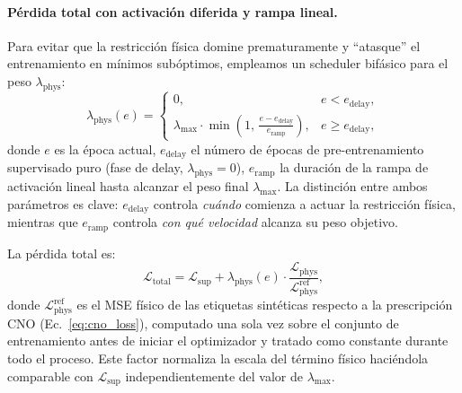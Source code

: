 \documentclass[sigconf,ACM]{acmart}
\begin{document}
\paragraph{Pérdida total con activación diferida y rampa lineal.}
Para evitar que la restricción física domine prematuramente y ``atasque'' el entrenamiento en mínimos subóptimos, empleamos un scheduler bifásico para el peso $\lambda_{\mathrm{phys}}$:
\begin{equation}
  \lambda_{\mathrm{phys}}(e) =
  \begin{cases}
    0, & e < e_{\mathrm{delay}}, \\
    \lambda_{\max} \cdot \min\!\left(1,\, \frac{e - e_{\mathrm{delay}}}{e_{\mathrm{ramp}}}\right), & e \geq e_{\mathrm{delay}},
  \end{cases}
  \label{eq:lambda_schedule}
\end{equation}
donde $e$ es la época actual, $e_{\mathrm{delay}}$ el número de épocas de pre-entrenamiento supervisado puro (fase de delay, $\lambda_{\mathrm{phys}}=0$), $e_{\mathrm{ramp}}$ la duración de la rampa de activación lineal hasta alcanzar el peso final $\lambda_{\max}$. La distinción entre ambos parámetros es clave: $e_{\mathrm{delay}}$ controla \emph{cuándo} comienza a actuar la restricción física, mientras que $e_{\mathrm{ramp}}$ controla \emph{con qué velocidad} alcanza su peso objetivo.

La pérdida total es:
\begin{equation}
  \mathcal{L}_{\mathrm{total}} = \mathcal{L}_{\mathrm{sup}} + \lambda_{\mathrm{phys}}(e) \cdot \frac{\mathcal{L}_{\mathrm{phys}}}{\mathcal{L}_{\mathrm{phys}}^{\mathrm{ref}}},
  \label{eq:l_total}
\end{equation}
donde $\mathcal{L}_{\mathrm{phys}}^{\mathrm{ref}}$ es el MSE físico de las etiquetas sintéticas respecto a la prescripción CNO (Ec.~\ref{eq:cno_loss}), computado una sola vez sobre el conjunto de entrenamiento antes de iniciar el optimizador y tratado como constante durante todo el proceso. Este factor normaliza la escala del término físico haciéndola comparable con $\mathcal{L}_{\mathrm{sup}}$ independientemente del valor de $\lambda_{\max}$.
\end{document}
